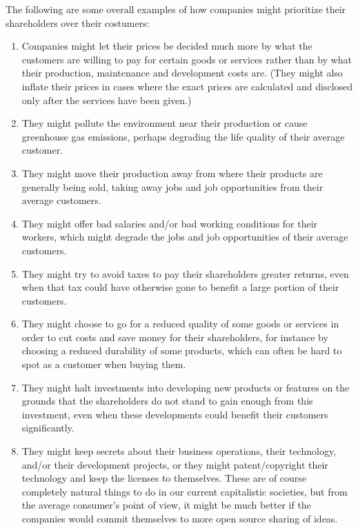\documentclass{article}
\begin{document}
The following are some overall examples of how companies might prioritize their shareholders over their costumers: 
\begin{enumerate}
	\item Companies might let their prices be decided much more by what the customers are willing to pay for certain goods or services rather than by what their production, maintenance and development costs are.
	(They might also inflate their prices in cases where the exact prices are calculated and disclosed only after the services have been given.)

	\item They might pollute the environment near their production or cause greenhouse gas emissions, perhaps degrading the life quality of their average customer. 
	
	\item They might move their production away from where their products are generally being sold, taking away jobs and job opportunities from their average customers.
	
	\item They might offer bad salaries and/or bad working conditions for their workers, which might degrade the jobs and job opportunities of their average customers.

	\item They might try to avoid taxes to pay their shareholders greater returns, even when that tax could have otherwise gone to benefit a large portion of their customers.

	\item They might choose to go for a reduced quality of some goods or services in order to cut costs and save money for their shareholders, for instance by choosing a reduced durability of some products, which can often be hard to spot as a customer when buying them. %
	
	\item They might halt investments into developing new products or features on the grounds that the shareholders do not stand to gain enough from this investment, even when these developments could benefit their customers significantly. 

	\item They might keep secrets about their business operations, their technology, and/or their development projects, or they might patent/copyright their technology and keep the licenses to themselves. These are of course completely natural things to do in our current capitalistic societies, but from the average consumer's point of view, it might be much better if the companies would commit themselves to more open source sharing of ideas.
\end{enumerate}
%
\end{document}
